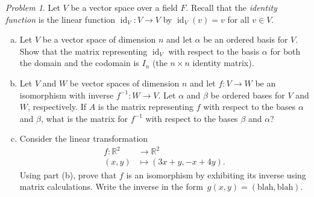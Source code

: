 \documentclass[11pt,twoside]{amsart}
\theoremstyle{plain}
\theoremstyle{remark}
\newtheorem{prob}{Problem}
\theoremstyle{definition}
\theoremstyle{definition}
\newcommand{\R}{\mathbb{R}}
\newcommand{\id}{\operatorname{id}}
\begin{document}
\begin{prob}
Let $V$ be a vector space over a field $F$. Recall that the {\em identity function} is
  the linear function $\id_V \colon V \to V$ by $\id_V(v)=v$ for all $v\in V$.
  \begin{enumerate}[(a)]
   \item Let $V$ be a vector space of dimension $n$ and let $\alpha$ be an
     ordered basis for $V$. Show that the matrix representing $\id_V$ with
     respect to the basis $\alpha$ for both the domain and the codomain is
     $I_n$ (the $n\times n$ identity matrix).
   \item Let $V$ and $W$ be vector spaces of dimension $n$ and let $f\colon V
     \to W$ be an isomorphism with inverse $f^{-1} \colon W \to V$. Let
     $\alpha$ and $\beta$ be ordered bases for $V$ and $W$,
     respectively. If $A$ is the matrix representing $f$ with respect to the
     bases $\alpha$ and $\beta$, what is the matrix for $f^{-1}$ with
     respect to the bases $\beta$ and $\alpha$?
   \item Consider the linear transformation
     \begin{align*}
       f\colon\R^2&\to\R^2\\
       (x,y)&\mapsto (3x+y,-x+4y).
     \end{align*}
     Using part (b), prove that $f$ is an isomorphism by
     exhibiting its inverse using matrix calculations.  Write the inverse in the
     form~$g(x,y) = (\text{blah},\text{blah})$.
  \end{enumerate}
\end{prob}
\end{document}
